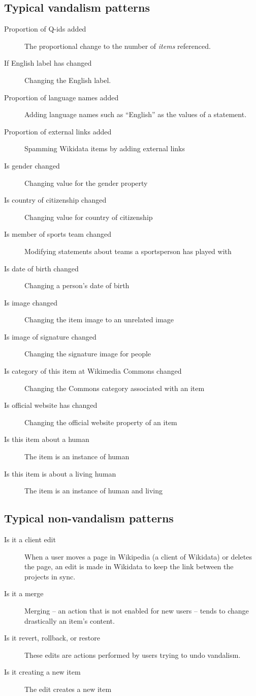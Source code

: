 \documentclass{sig-alternate}
\begin{document}
\subsection{Typical vandalism patterns}
\begin{description}
\item[Proportion of Q-ids added] The proportional change to the number of \textit{items} referenced.
\item[If English label has changed] Changing the English label.
\item[Proportion of language names added]  Adding language names such as ``English'' as the values of a statement.
\item[Proportion of external links added]  Spamming Wikidata items by adding external links
\item[Is gender changed] Changing value for the gender property
\item[Is country of citizenship changed]  Changing value for country of citizenship
\item[Is member of sports team changed] Modifying statements about teams a sportsperson has played with
\item[Is date of birth changed]  Changing a person's date of birth
\item[Is image changed]  Changing the item image to an unrelated image
\item[Is image of signature changed]  Changing the signature image for people
\item[Is category of this item at Wikimedia Commons changed]  Changing the Commons category associated with an item
\item[Is official website has changed]  Changing the official website property of an item
\item[Is this item about a human]  The item is an instance of human
\item[Is this item is about a living human]  The item is an instance of human and living
\end{description}
\subsection{Typical non-vandalism patterns}
\begin{description}
\item[Is it a client edit] When a user moves a page in Wikipedia (a client of Wikidata) or deletes the page, an edit is made in Wikidata to keep the link between the projects in sync.
\item[Is it a merge] Merging – an action that is not enabled for new users – tends to change drastically an item's content.
\item[Is it revert, rollback, or restore] These edits are actions performed by users trying to undo vandalism.
\item[Is it creating a new item] The edit creates a new item
\end{description}
\end{document}
